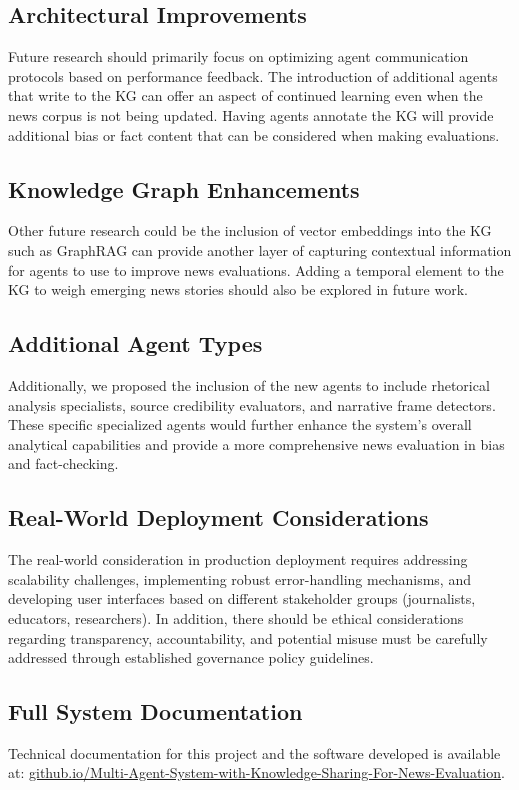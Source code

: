 \documentclass{scrartcl}
\begin{document}
\subsection{Architectural Improvements}
Future research should primarily focus on optimizing agent communication protocols based on performance feedback. The introduction of additional agents that write to the KG can offer an aspect of continued learning even when the news corpus is not being updated. Having agents annotate the KG will provide additional bias or fact content that can be considered when making evaluations. 

\subsection{Knowledge Graph Enhancements}
Other future research could be the inclusion of vector embeddings into the KG such as GraphRAG can provide another layer of capturing contextual information for agents to use to improve news evaluations. Adding a temporal element to the KG to weigh emerging news stories should also be explored in future work.

\subsection{Additional Agent Types}
Additionally, we proposed the inclusion of the new agents to include rhetorical analysis specialists, source credibility evaluators, and narrative frame detectors. These specific specialized agents would further enhance the system’s overall analytical capabilities and provide a more comprehensive news evaluation in bias and fact-checking.

\subsection{Real-World Deployment Considerations}
The real-world consideration in production deployment requires addressing scalability challenges, implementing robust error-handling mechanisms, and developing user interfaces based on different stakeholder groups (journalists, educators, researchers). In addition, there should be ethical considerations regarding transparency, accountability, and potential misuse must be carefully addressed through established governance policy guidelines.
 
\subsection{Full System Documentation}
Technical documentation for this project and the software developed is available at:  
\href{https://modupeolawuraola.github.io/Multi-Agent-System-with-Knowledge-Sharing-For-News-Evaluation/architecture.html}{github.io/Multi-Agent-System-with-Knowledge-Sharing-For-News-Evaluation}.
\end{document}
